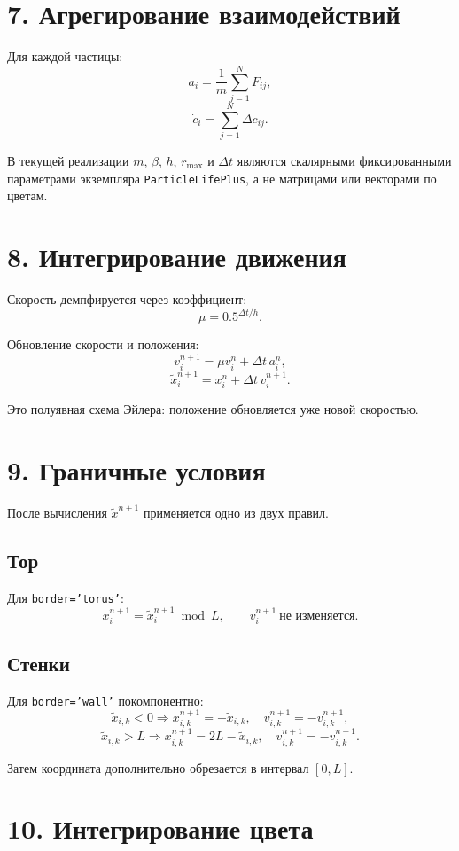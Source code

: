 \documentclass[11pt,a4paper]{article}
\begin{document}
\section*{7. Агрегирование взаимодействий}

Для каждой частицы:
\[
a_i=\frac{1}{m}\sum_{j=1}^{N}F_{ij},
\]
\[
\dot{c}_i=\sum_{j=1}^{N}\Delta c_{ij}.
\]

В текущей реализации $m$, $\beta$, $h$, $r_{\max}$ и $\Delta t$ являются
скалярными фиксированными параметрами экземпляра \texttt{ParticleLifePlus}, а не
матрицами или векторами по цветам.

\section*{8. Интегрирование движения}

Скорость демпфируется через коэффициент:
\[
\mu=0.5^{\Delta t/h}.
\]

Обновление скорости и положения:
\[
v_i^{n+1}=\mu v_i^n+\Delta t\,a_i^n,
\]
\[
\tilde{x}_i^{n+1}=x_i^n+\Delta t\,v_i^{n+1}.
\]

Это полуявная схема Эйлера: положение обновляется уже новой скоростью.

\section*{9. Граничные условия}

После вычисления $\tilde{x}^{n+1}$ применяется одно из двух правил.

\subsection*{Тор}

Для \texttt{border='torus'}:
\[
x_i^{n+1}=\tilde{x}_i^{n+1}\bmod L,\qquad
v_i^{n+1}\ \text{не изменяется}.
\]

\subsection*{Стенки}

Для \texttt{border='wall'} покомпонентно:
\[
\tilde{x}_{i,k}<0 \Rightarrow
x_{i,k}^{n+1}=-\tilde{x}_{i,k},\quad
v_{i,k}^{n+1}=-v_{i,k}^{n+1},
\]
\[
\tilde{x}_{i,k}>L \Rightarrow
x_{i,k}^{n+1}=2L-\tilde{x}_{i,k},\quad
v_{i,k}^{n+1}=-v_{i,k}^{n+1}.
\]

Затем координата дополнительно обрезается в интервал $[0,L]$.

\section*{10. Интегрирование цвета}
\end{document}
